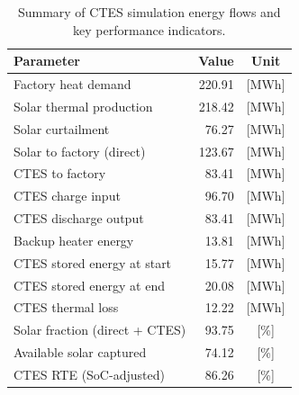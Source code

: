 \renewcommand{\arraystretch}{1.2}
\begin{table}[h]
\centering
\begin{tabular}{l|r c}
\hline
Parameter & Value & Unit \\
\hline
Factory heat demand & 220.91 & [MWh] \\
Solar thermal production & 218.42 & [MWh] \\
Solar curtailment & 76.27 & [MWh] \\
Solar to factory (direct) & 123.67 & [MWh] \\
CTES to factory & 83.41 & [MWh] \\
CTES charge input & 96.70 & [MWh] \\
CTES discharge output & 83.41 & [MWh] \\
Backup heater energy & 13.81 & [MWh] \\
CTES stored energy at start & 15.77 & [MWh] \\
CTES stored energy at end & 20.08 & [MWh] \\
CTES thermal loss & 12.22 & [MWh] \\
\hline
Solar fraction (direct + CTES) & 93.75 & [\%] \\
Available solar captured & 74.12 & [\%] \\
CTES RTE (SoC-adjusted) & 86.26 & [\%] \\
\hline
\end{tabular}
\caption{Summary of CTES simulation energy flows and key performance indicators.}
\label{tab:ctes-simulation-summary}
\end{table}
